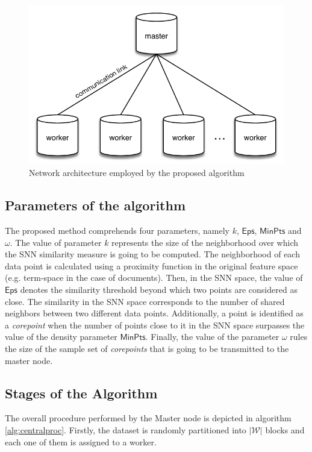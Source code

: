 \documentclass[preprint,12pt,authoryear,review]{elsarticle}
\begin{document}
\begin{figure}[!htbp]
\centering
  \includegraphics[scale=0.8]{distributed_architecture.pdf}
  \caption{Network architecture employed by the proposed algorithm}
  \label{fig:distributed_architecture}
\end{figure}

\subsection*{Parameters of the algorithm}
The proposed method comprehends four parameters, namely $k$, $\mathsf{Eps}$, $\mathsf{MinPts}$ and $\omega$. The value of parameter $k$ represents the size of the neighborhood over which the SNN similarity measure is going to be computed. The neighborhood of each data point is calculated using a proximity function in the original feature space (e.g. term-space in the case of documents). Then, in the SNN space, the value of $\mathsf{Eps}$ denotes the similarity threshold beyond which two points are considered as close. The similarity in the SNN space corresponds to the number of shared neighbors between two different data points. Additionally, a point is identified as a \textit{corepoint} when the number of points close to it in the SNN space surpasses the value of the density parameter $\mathsf{MinPts}$. Finally, the value of the parameter $\omega$ rules the size of the sample set of \textit{corepoints} that is going to be transmitted to the master node.



\subsection*{Stages of the Algorithm}
The overall procedure performed by the Master node is depicted in algorithm \ref{alg:centralproc}. Firstly, the dataset is randomly partitioned into $|\mathcal{W}|$ blocks and each one of them is assigned to a worker.
\end{document}
